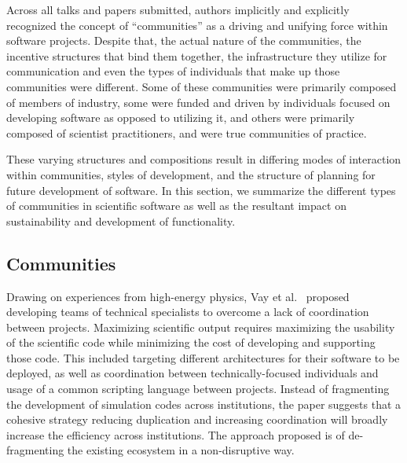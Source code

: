 \documentclass[11pt, oneside]{amsart}
\begin{document}
Across all talks and papers submitted, authors implicitly and
explicitly recognized the concept of ``communities'' as a driving and
unifying force within software projects.  Despite that, the actual
nature of the communities, the incentive structures that bind them
together, the infrastructure they utilize for communication and even
the types of individuals that make up those communities were
different.  Some of these communities were primarily composed of
members of industry, some were funded and driven by individuals
focused on developing software as opposed to utilizing it, and others
were primarily composed of scientist practitioners, and were true
communities of practice.

These varying structures and compositions result in differing modes of
interaction within communities, styles of development, and the
structure of planning for future development of software.  In this
section, we summarize the different types of communities in scientific
software as well as the resultant impact on sustainability and
development of functionality.

\subsection{Communities}


Drawing on experiences from high-energy physics, Vay et
al.~\cite{Vay_WSSSPE} proposed developing teams of technical
specialists   to overcome a lack of coordination between projects.
Maximizing scientific output requires maximizing the usability of the
scientific code while minimizing the cost of developing and
supporting those code.  This included targeting different
architectures for their software to be deployed, as well as
coordination between technically-focused individuals and usage of a
common scripting language between projects.  Instead of fragmenting
the development of simulation codes across institutions, the paper
suggests that a cohesive strategy reducing duplication and increasing
coordination will broadly increase the efficiency across institutions.
The approach proposed is of de-fragmenting the existing ecosystem in a
non-disruptive way.
\end{document}
